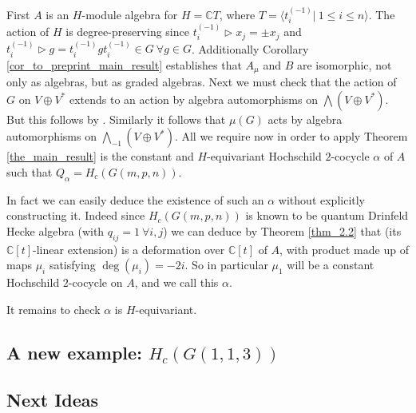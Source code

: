 \documentclass[10pt]{article}
\newcommand{\bb}{\medbreak}
\newcommand{\nt}{\noindent}
\newcommand{\Cc }{\mathbb{C}}
\theoremstyle{definition}
\begin{document}
\nt First $A$ is an $H$-module algebra for $H=\Cc T$, where $T=\langle t_i^{(-1)}|\ 1\leq i \leq n\rangle$. The action of $H$ is degree-preserving since $t_i^{(-1)}\rhd x_j=\pm x_j$ and $t_i^{(-1)}\rhd g=t_i^{(-1)}gt_i^{(-1)}\in G\ \forall g\in G$. Additionally Corollary \ref{cor_to_preprint_main_result} establishes that $A_\mu$ and $B$ are isomorphic, not only as algebras, but as graded algebras. Next we must check that the action of $G$ on $V\oplus V^*$ extends to an action by algebra automorphisms on $\bigwedge(V\oplus V^*)$. But this follows by \cite[Lemma 4.2]{2011arXiv11115243N}. Similarly it follows that $\mu(G)$ acts by algebra automorphisms on $\bigwedge_{-1}(V\oplus V^*)$. All we require now in order to apply Theorem \ref{the_main_result} is the constant and $H$-equivariant Hochschild $2$-cocycle $\alpha$ of $A$ such that $Q_\alpha=H_c(G(m,p,n))$.\bb

\nt In fact we can easily deduce the existence of such an $\alpha$ without explicitly constructing it. Indeed since $H_c(G(m,p,n))$ is known to be quantum Drinfeld Hecke algebra (with $q_{ij}=1\ \forall i,j$) we can deduce by Theorem \ref{thm_2.2} that (its $\Cc[t]$-linear extension) is a deformation over $\Cc[t]$ of $A$, with product made up of maps $\mu_i$ satisfying $\deg(\mu_i)=-2i$. So in particular $\mu_1$ will be a constant Hochschild $2$-cocycle on $A$, and we call this $\alpha$.\bb

\nt It remains to check $\alpha$ is $H$-equivariant. 






\subsection{A new example: \texorpdfstring{$H_c(G(1,1,3))$}{HcG113}}\label{new_example_sec}






\iffalse
\subsection*{Next Ideas}
\end{document}
